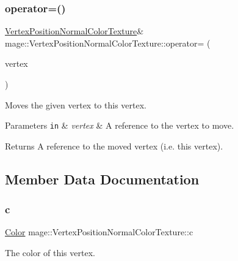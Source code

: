\subsubsection{\texorpdfstring{operator=()}{operator=()}\hspace{0.1cm}{\footnotesize\ttfamily [2/2]}}
{\footnotesize\ttfamily \hyperlink{structmage_1_1_vertex_position_normal_color_texture}{Vertex\+Position\+Normal\+Color\+Texture}\& mage\+::\+Vertex\+Position\+Normal\+Color\+Texture\+::operator= (\begin{DoxyParamCaption}\item[{\hyperlink{structmage_1_1_vertex_position_normal_color_texture}{Vertex\+Position\+Normal\+Color\+Texture} \&\&}]{vertex }\end{DoxyParamCaption})\hspace{0.3cm}{\ttfamily [default]}}

Moves the given vertex to this vertex.


\begin{DoxyParams}[1]{Parameters}
\mbox{\tt in}  & {\em vertex} & A reference to the vertex to move. \\
\hline
\end{DoxyParams}
\begin{DoxyReturn}{Returns}
A reference to the moved vertex (i.\+e. this vertex). 
\end{DoxyReturn}


\subsection{Member Data Documentation}
\hypertarget{structmage_1_1_vertex_position_normal_color_texture_a6b28cefeab374c3f38c44b49eea2ec78}{}\label{structmage_1_1_vertex_position_normal_color_texture_a6b28cefeab374c3f38c44b49eea2ec78} 
\subsubsection{\texorpdfstring{c}{c}}
{\footnotesize\ttfamily \hyperlink{structmage_1_1_color}{Color} mage\+::\+Vertex\+Position\+Normal\+Color\+Texture\+::c}

The color of this vertex. \hypertarget{structmage_1_1_vertex_position_normal_color_texture_af00c662c12d40c1fffe5df6896a95f82}{}\label{structmage_1_1_vertex_position_normal_color_texture_af00c662c12d40c1fffe5df6896a95f82} 
